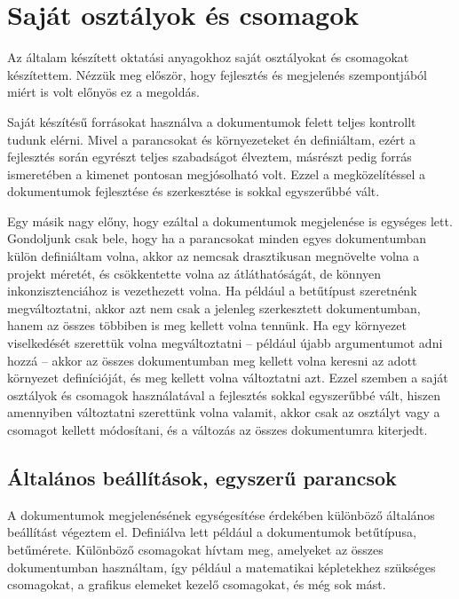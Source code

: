\section{Saját osztályok és csomagok}

Az általam készített oktatási anyagokhoz saját osztályokat és csomagokat
készítettem. Nézzük meg először, hogy fejlesztés és megjelenés szempontjából
miért is volt előnyös ez a megoldás.

Saját készítésű forrásokat használva a dokumentumok felett teljes kontrollt
tudunk elérni. Mivel a parancsokat és környezeteket én definiáltam, ezért
a fejlesztés során egyrészt teljes szabadságot élveztem, másrészt pedig
forrás ismeretében a kimenet pontosan megjósolható volt. Ezzel a megközelítéssel
a dokumentumok fejlesztése és szerkesztése is sokkal egyszerűbbé vált.

Egy másik nagy előny, hogy ezáltal a dokumentumok megjelenése is egységes lett.
Gondoljunk csak bele, hogy ha a parancsokat minden egyes dokumentumban külön
definiáltam volna, akkor az nemcsak drasztikusan megnövelte volna a projekt
méretét, és csökkentette volna az átláthatóságát, de könnyen inkonzisztenciához
is vezethezett volna. Ha például a betűtípust szeretnénk megváltoztatni, akkor
azt nem csak a jelenleg szerkesztett dokumentumban, hanem az összes többiben
is meg kellett volna tennünk. Ha egy környezet viselkedését szerettük volna
megváltoztatni -- például újabb argumentumot adni hozzá -- akkor az összes
dokumentumban meg kellett volna keresni az adott környezet definícióját, és
meg kellett volna változtatni azt. Ezzel szemben a saját osztályok és csomagok
használatával a fejlesztés sokkal egyszerűbbé vált, hiszen amennyiben
változtatni szerettünk volna valamit, akkor csak az osztályt vagy a csomagot
kellett módosítani, és a változás az összes dokumentumra kiterjedt.

\subsection{Általános beállítások, egyszerű parancsok}

A dokumentumok megjelenésének egységesítése érdekében különböző általános
beállítást végeztem el. Definiálva lett például a dokumentumok betűtípusa,
betűmérete. Különböző csomagokat hívtam meg, amelyeket az összes dokumentumban
használtam, így például a matematikai képletekhez szükséges csomagokat, a
grafikus elemeket kezelő csomagokat, és még sok mást.

